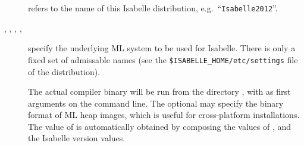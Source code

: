 \begin{isabellebody}
\begin{isamarkuptext}
\begin{description}
  \item[\hypertarget{setting.ISABELLE-IDENTIFIER}{\hyperlink{setting.ISABELLE-IDENTIFIER}{\mbox{}}}] refers
  to the name of this Isabelle distribution, e.g.\ ``\verb|Isabelle2012|''.

  \item[\hypertarget{setting.ML-SYSTEM}{\hyperlink{setting.ML-SYSTEM}{\mbox{}}}, \hypertarget{setting.ML-HOME}{\hyperlink{setting.ML-HOME}{\mbox{}}},
  \hypertarget{setting.ML-OPTIONS}{\hyperlink{setting.ML-OPTIONS}{\mbox{}}}, \hypertarget{setting.ML-PLATFORM}{\hyperlink{setting.ML-PLATFORM}{\mbox{}}}, \hypertarget{setting.ML-IDENTIFIER}{\hyperlink{setting.ML-IDENTIFIER}{\mbox{}}}] specify the underlying ML system
  to be used for Isabelle.  There is only a fixed set of admissable
  \hyperlink{setting.ML-SYSTEM}{\mbox{}} names (see the \verb|$ISABELLE_HOME/etc/settings| file of the distribution).
  
  The actual compiler binary will be run from the directory \hyperlink{setting.ML-HOME}{\mbox{}}, with \hyperlink{setting.ML-OPTIONS}{\mbox{}} as first arguments on the
  command line.  The optional \hyperlink{setting.ML-PLATFORM}{\mbox{}} may specify the
  binary format of ML heap images, which is useful for cross-platform
  installations.  The value of \hyperlink{setting.ML-IDENTIFIER}{\mbox{}} is
  automatically obtained by composing the values of \hyperlink{setting.ML-SYSTEM}{\mbox{}}, \hyperlink{setting.ML-PLATFORM}{\mbox{}} and the Isabelle version values.


\end{description}
\end{isamarkuptext}
\end{isabellebody}
